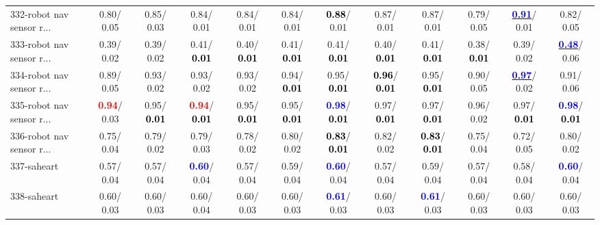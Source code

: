 \begin{table}[h]
\begin{center}
{\begin{tabular}{lc|c|c|c|c|c|c|c|c|c|c}
332-robot nav sensor r... &   0.80/  0.05 &   0.85/  0.03 &   0.84/  0.01 &   0.84/  0.01 &   0.84/  0.01 & \textcolor{black}{\textbf{  0.88}}/  0.01 &   0.87/  0.01 &   0.87/  0.01 &   0.79/  0.05 & \underline{\textcolor{blue}{\textbf{  0.91}}}/  0.01 &   0.82/  0.05 \\
333-robot nav sensor r... &   0.39/  0.02 &   0.39/  0.02 &   0.41/\textcolor{black}{\textbf{  0.01}} &   0.40/\textcolor{black}{\textbf{  0.01}} &   0.41/\textcolor{black}{\textbf{  0.01}} &   0.41/\textcolor{black}{\textbf{  0.01}} &   0.40/\textcolor{black}{\textbf{  0.01}} &   0.41/\textcolor{black}{\textbf{  0.01}} &   0.38/\textcolor{black}{\textbf{  0.01}} &   0.39/  0.02 & \underline{\textcolor{blue}{\textbf{  0.48}}}/  0.06 \\
334-robot nav sensor r... &   0.89/  0.05 &   0.93/  0.02 &   0.93/  0.02 &   0.93/  0.02 &   0.94/\textcolor{black}{\textbf{  0.01}} &   0.95/\textcolor{black}{\textbf{  0.01}} & \textcolor{black}{\textbf{  0.96}}/\textcolor{black}{\textbf{  0.01}} &   0.95/\textcolor{black}{\textbf{  0.01}} &   0.90/  0.05 & \underline{\textcolor{blue}{\textbf{  0.97}}}/  0.02 &   0.91/  0.06 \\ \hline
335-robot nav sensor r... & \textcolor{red}{\textbf{  0.94}}/  0.03 &   0.95/\textcolor{black}{\textbf{  0.01}} & \textcolor{red}{\textbf{  0.94}}/\textcolor{black}{\textbf{  0.01}} &   0.95/\textcolor{black}{\textbf{  0.01}} &   0.95/\textcolor{black}{\textbf{  0.01}} & \textcolor{blue}{\textbf{  0.98}}/\textcolor{black}{\textbf{  0.01}} &   0.97/\textcolor{black}{\textbf{  0.01}} &   0.97/\textcolor{black}{\textbf{  0.01}} &   0.96/  0.02 &   0.97/\textcolor{black}{\textbf{  0.01}} & \textcolor{blue}{\textbf{  0.98}}/\textcolor{black}{\textbf{  0.01}} \\
336-robot nav sensor r... &   0.75/  0.04 &   0.79/  0.02 &   0.79/  0.03 &   0.78/  0.02 &   0.80/  0.02 & \textcolor{black}{\textbf{  0.83}}/\textcolor{black}{\textbf{  0.01}} &   0.82/  0.02 & \textcolor{black}{\textbf{  0.83}}/\textcolor{black}{\textbf{  0.01}} &   0.75/  0.04 &   0.72/  0.05 &   0.80/  0.02 \\
337-saheart &   0.57/  0.04 &   0.57/  0.04 & \textcolor{blue}{\textbf{  0.60}}/  0.04 &   0.57/  0.04 &   0.59/  0.04 & \textcolor{blue}{\textbf{  0.60}}/  0.04 &   0.57/  0.04 &   0.59/  0.04 &   0.57/  0.04 &   0.58/  0.04 & \textcolor{blue}{\textbf{  0.60}}/  0.04 \\
338-saheart &   0.60/  0.03 &   0.60/  0.03 &   0.60/  0.04 &   0.60/  0.03 &   0.60/  0.03 & \textcolor{blue}{\textbf{  0.61}}/  0.03 &   0.60/  0.03 & \textcolor{blue}{\textbf{  0.61}}/  0.03 &   0.60/  0.03 &   0.60/  0.03 &   0.60/  0.03 \\

\end{tabular}}
\end{center}
\end{table}
